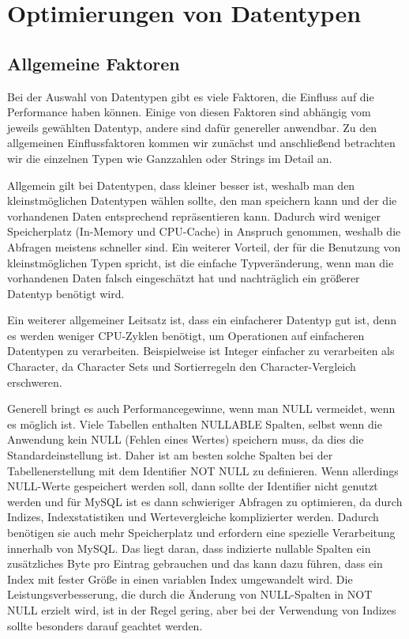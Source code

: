 
\chapter{Optimierungen von Datentypen}

\section{Allgemeine Faktoren}

Bei der Auswahl von Datentypen gibt es viele Faktoren, die Einfluss auf die Performance haben können.
Einige von diesen Faktoren sind abhängig vom jeweils gewählten Datentyp, andere sind dafür genereller anwendbar.
Zu den allgemeinen Einflussfaktoren kommen wir zunächst und anschließend betrachten wir die einzelnen Typen wie Ganzzahlen oder Strings im Detail an.

Allgemein gilt bei Datentypen, dass kleiner besser ist, weshalb man den kleinstmöglichen Datentypen wählen sollte, den man speichern kann und der die vorhandenen Daten entsprechend repräsentieren kann.
Dadurch wird weniger Speicherplatz (In-Memory und CPU-Cache) in Anspruch genommen, weshalb die Abfragen meistens schneller sind.
Ein weiterer Vorteil, der für die Benutzung von kleinstmöglichen Typen spricht, ist die einfache Typveränderung, wenn man die vorhandenen Daten falsch eingeschätzt hat und nachträglich ein größerer Datentyp benötigt wird.

Ein weiterer allgemeiner Leitsatz ist, dass ein einfacherer Datentyp gut ist, denn es werden weniger CPU-Zyklen benötigt, um Operationen auf einfacheren Datentypen zu verarbeiten.
Beispielweise ist Integer einfacher zu verarbeiten als Character, da Character Sets und Sortierregeln den Character-Vergleich erschweren.

Generell bringt es auch Performancegewinne, wenn man NULL vermeidet, wenn es möglich ist.
Viele Tabellen enthalten NULLABLE Spalten, selbst wenn die Anwendung kein NULL (Fehlen eines Wertes) speichern muss, da dies die Standardeinstellung ist.
Daher ist am besten solche Spalten bei der Tabellenerstellung mit dem Identifier NOT NULL zu definieren.
Wenn allerdings NULL-Werte gespeichert werden soll, dann sollte der Identifier nicht genutzt werden und für MySQL ist es dann schwieriger Abfragen zu optimieren, da durch Indizes, Indexstatistiken und Wertevergleiche komplizierter werden.
Dadurch benötigen sie auch mehr Speicherplatz und erfordern eine spezielle Verarbeitung innerhalb von MySQL.
Das liegt daran, dass indizierte nullable Spalten ein zusätzliches Byte pro Eintrag gebrauchen und das kann dazu führen, dass ein Index mit fester Größe in einen variablen Index umgewandelt wird.
Die Leistungsverbesserung, die durch die Änderung von NULL-Spalten in NOT NULL erzielt wird, ist in der Regel gering, aber bei der Verwendung von Indizes sollte besonders darauf geachtet werden.

